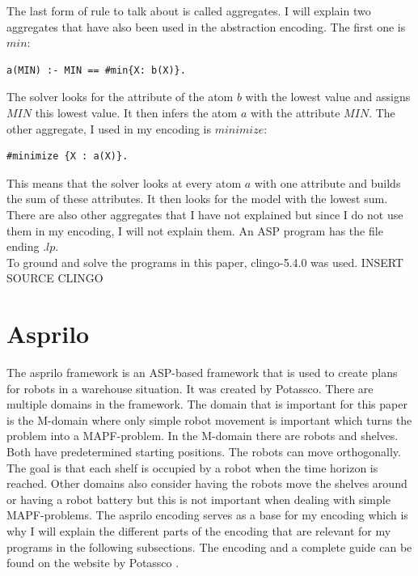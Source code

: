 \documentclass[runningheads]{llncs}
\begin{document}
The last form of rule to talk about is called aggregates. I will explain two aggregates that have also been used in the abstraction encoding. The first one is $min$:
\begin{verbatim}
a(MIN) :- MIN == #min{X: b(X)}.
\end{verbatim}
The solver looks for the attribute of the atom $b$ with the lowest value and assigns  $MIN$ this lowest value. It then infers the atom $a$ with the attribute $MIN$. The other aggregate, I used in my encoding is $minimize$:
\begin{verbatim}
#minimize {X : a(X)}.
\end{verbatim}
This means that the solver looks at every atom $a$ with one attribute and builds the sum of these attributes. It then looks for the model with the lowest sum. \\
There are also other aggregates that I have not explained but since I do not use them in my encoding, I will not explain them. An ASP program has the file ending $.lp$.\\
To ground and solve the programs in this paper, clingo-5.4.0 was used. INSERT SOURCE CLINGO



\section{Asprilo}
The asprilo framework is an ASP-based framework that is used to create plans for robots in a warehouse situation. It was created by Potassco. There are multiple domains in the framework. The domain that is important for this paper is the M-domain where only simple robot movement is important which turns the problem into a MAPF-problem. In the M-domain there are robots and shelves. Both have predetermined starting positions. The robots can move orthogonally. The goal is that each shelf is occupied by a robot when the time horizon is reached. Other domains also consider having the robots move the shelves around or having a robot battery but this is not important when dealing with simple MAPF-problems. The asprilo encoding serves as a base for my encoding which is why I will explain the different parts of the encoding that are relevant for my programs in the following subsections. The encoding and a complete guide can be found on the website by Potassco \cite{asprilo}.
\end{document}
